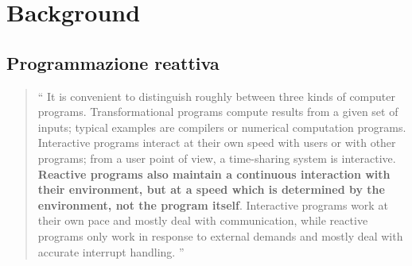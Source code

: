     \begin{frame}[c]
        \titlepage
    \end{frame}

    \section{Background}\label{sec:intro}
        \subsection{Programmazione reattiva}\label{subsec:react}
        \begin{frame}{\insertsectionhead}
            \begin{block}{\insertsubsectionhead}
                \smallskip
                \begin{quote}
                    `` It is convenient to distinguish roughly between three kinds of computer programs.
                    Transformational programs compute results from a given set of inputs;
                    typical examples are compilers or numerical computation programs.
                    Interactive programs interact at their own speed with users or with other programs;
                    from a user point of view, a time-sharing system is interactive.
                    \textbf{Reactive programs also maintain a continuous interaction with their environment, but at a speed which is determined by the environment, not the program itself}.
                    Interactive programs work at their own pace and mostly deal with communication, while reactive programs only work in response to external demands and mostly deal with accurate interrupt handling. ''
                \end{quote}
            \end{block}
        \end{frame}

